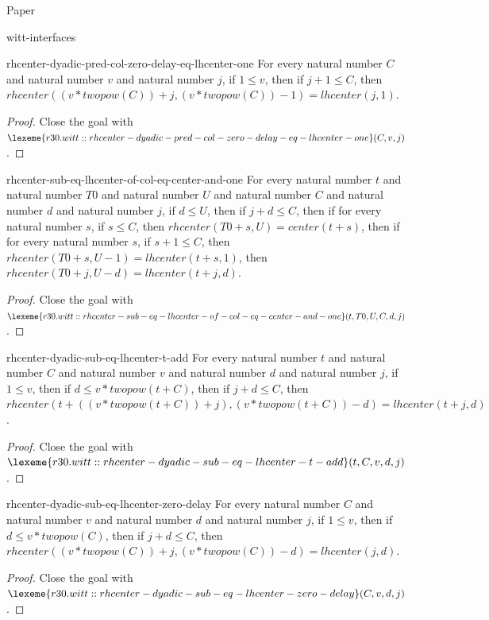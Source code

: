 \begin{lexlean}{Paper}
\begin{section}{witt-interfaces}
  \begin{theorem}{rhcenter-dyadic-pred-col-zero-delay-eq-lhcenter-one}
  For every natural number \(C\) and natural number \(v\) and natural number \(j\), if \(1 ≤ v\), then if \(j + 1 ≤ C\), then \(rhcenter((v * twopow(C)) + j, (v * twopow(C)) - 1) = lhcenter(j, 1)\).
  \begin{proof}
  Close the goal with \(\lexeme{r30.witt::rhcenter-dyadic-pred-col-zero-delay-eq-lhcenter-one}(C, v, j)\).
  \end{proof}
  \end{theorem}

  \begin{theorem}{rhcenter-sub-eq-lhcenter-of-col-eq-center-and-one}
  For every natural number \(t\) and natural number \(T0\) and natural number \(U\) and natural number \(C\) and natural number \(d\) and natural number \(j\), if \(d ≤ U\), then if \(j + d ≤ C\), then if for every natural number \(s\), if \(s ≤ C\), then \(rhcenter(T0 + s, U) = center(t + s)\), then if for every natural number \(s\), if \(s + 1 ≤ C\), then \(rhcenter(T0 + s, U - 1) = lhcenter(t + s, 1)\), then \(rhcenter(T0 + j, U - d) = lhcenter(t + j, d)\).
  \begin{proof}
  Close the goal with \(\lexeme{r30.witt::rhcenter-sub-eq-lhcenter-of-col-eq-center-and-one}(t, T0, U, C, d, j)\).
  \end{proof}
  \end{theorem}

  \begin{theorem}{rhcenter-dyadic-sub-eq-lhcenter-t-add}
  For every natural number \(t\) and natural number \(C\) and natural number \(v\) and natural number \(d\) and natural number \(j\), if \(1 ≤ v\), then if \(d ≤ v * twopow(t + C)\), then if \(j + d ≤ C\), then \(rhcenter(t + ((v * twopow(t + C)) + j), (v * twopow(t + C)) - d) = lhcenter(t + j, d)\).
  \begin{proof}
  Close the goal with \(\lexeme{r30.witt::rhcenter-dyadic-sub-eq-lhcenter-t-add}(t, C, v, d, j)\).
  \end{proof}
  \end{theorem}

  \begin{theorem}{rhcenter-dyadic-sub-eq-lhcenter-zero-delay}
  For every natural number \(C\) and natural number \(v\) and natural number \(d\) and natural number \(j\), if \(1 ≤ v\), then if \(d ≤ v * twopow(C)\), then if \(j + d ≤ C\), then \(rhcenter((v * twopow(C)) + j, (v * twopow(C)) - d) = lhcenter(j, d)\).
  \begin{proof}
  Close the goal with \(\lexeme{r30.witt::rhcenter-dyadic-sub-eq-lhcenter-zero-delay}(C, v, d, j)\).
  \end{proof}
  \end{theorem}


\end{section}
\end{lexlean}
